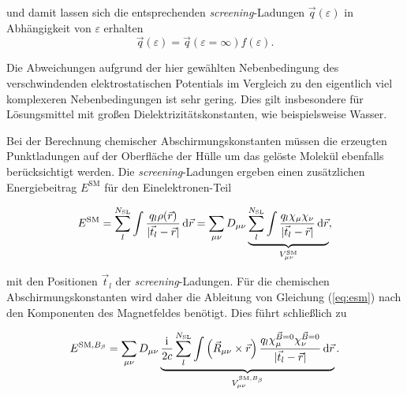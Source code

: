 und damit lassen sich die entsprechenden \textit{screening}-Ladungen $\vec{q}(\varepsilon)$ in Abhängigkeit von $\varepsilon$ erhalten
	\begin{equation}
	\vec{q}(\varepsilon)=\vec{q}(\varepsilon=\infty)f(\varepsilon).
	\end{equation}
	
Die Abweichungen aufgrund der hier gewählten Nebenbedingung des verschwindenden elektrostatischen Potentials im Vergleich zu den eigentlich viel komplexeren Nebenbedingungen ist sehr gering.\supercite{klamt1993cosmo} Dies gilt insbesondere für Lösungsmittel mit großen Dielektrizitätskonstanten, wie beispielsweise Wasser.

Bei der Berechnung chemischer Abschirmungskonstanten müssen die erzeugten Punktladungen auf der Oberfläche der Hülle um das gelöste Molekül ebenfalls berücksichtigt werden. Die \textit{screening}-Ladungen ergeben einen zusätzlichen Energiebeitrag $E^{\textrm{SM}}$ für den Einelektronen-Teil\supercite{cammi1999nuclear}

	\begin{equation}\label{eq:esm}
	E^{\textrm{SM}}=\sum_{l}^{N_{\textrm{SL}}}\int\frac{q_l\rho(\vec{r})}{\vert\vec{t}_l-\vec{r}\vert}\mathop{}\!\mathrm{d}\vec{r}=\sum_{\mu\nu}D_{\mu\nu}\underbrace{\sum_l^{N_{\textrm{SL}}}\int\frac{q_l\chi_\mu\chi_\nu}{\vert\vec{t}_l-\vec{r}\vert}\mathop{}\!\mathrm{d}\vec{r}}_{V_{\mu\nu}^{\textrm{SM}}},
	\end{equation}
	
mit den Positionen $\vec{t}_l$ der \textit{screening}-Ladungen. Für die chemischen Abschirmungskonstanten wird daher die Ableitung von Gleichung (\ref{eq:esm}) nach den Komponenten des Magnetfeldes benötigt. Dies führt schließlich zu

	\begin{equation}\label{eq:esmdb}
	E^{\textrm{SM},B_\beta}=\sum_{\mu\nu}D_{\mu\nu}\underbrace{\frac{\mathrm{i}\mkern1mu}{2c}\sum_l^{N_{\textrm{SL}}}\int\left(\vec{R}_{\mu\nu}\times\vec{r}\right)\frac{q_l\chi_\mu^{\vec{B}=0}\chi_\nu^{\vec{B}=0}}{\vert\vec{t}_l-\vec{r}\vert}\mathop{}\!\mathrm{d}\vec{r}}_{V_{\mu\nu}^{\textrm{SM},B_\beta}}.
	\end{equation}
